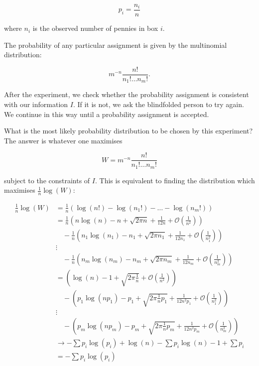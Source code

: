 \documentclass[
]{book}
\begin{document}
\[
p_i = \frac{n_i}{n} 
\]

where \(n_i\) is the observed number of pennies in box \(i\).

The probability of any particular assignment is given by the multinomial distribution:

\[
m^{-n} \frac{n!}{n_1! \dots n_m!}.
\]

After the experiment, we check whether the probability assignment is consistent with our information \(I\). If it is not, we ask the blindfolded person to try again. We continue in this way until a probability assignment is accepted.

What is the most likely probability distribution to be chosen by this experiment? The answer is whatever one maximises

\[
W = m^{-n} \frac{n!}{n_1! \dots n_m!}
\]

subject to the constraints of \(I\). This is equivalent to finding the distribution which maximises \(\frac{1}{n} \log(W)\):

\[
\begin{aligned}
\frac{1}{n} \log(W) &= \frac{1}{n} \left( \log(n!) - \log(n_1!) - \dots - \log(n_m!) \right) \\
 &= \frac{1}{n} \left( n \log(n) - n + \sqrt{2 \pi n} + \frac{1}{12n} + \mathcal{O}\left(\frac{1}{n^2}\right) \right) \\ 
 &\quad - \frac{1}{n} \left( n_1 \log(n_1) - n_1 + \sqrt{2 \pi n_1} + \frac{1}{12n_1} + \mathcal{O}\left(\frac{1}{n_1^2}\right)  \right) \\
 &\vdots \\
 &\quad- \frac{1}{n} \left( n_m \log(n_m) - n_m + \sqrt{2 \pi n_m} + \frac{1}{12n_m} + \mathcal{O}\left(\frac{1}{n_m^2}\right)  \right)  \\
 &= \left( \log(n) - 1 + \sqrt{2 \pi \frac{1}{n}} + \mathcal{O}\left(\frac{1}{n^2}\right) \right) \\ 
 &\quad- \left( p_1 \log(np_1) - p_1 + \sqrt{2 \pi \frac{1}{n}p_1} + \frac{1}{12n^2p_1} + \mathcal{O}\left(\frac{1}{n_1^2}\right)  \right) \\
 &\vdots \\
 &\quad- \left( p_m \log(np_m) - p_m + \sqrt{2 \pi \frac{1}{n}p_m} + \frac{1}{12n^2p_m} + \mathcal{O}\left(\frac{1}{n_m^2}\right)  \right) \\
 &\to -\sum p_i \log(p_i) +\log(n) -\sum p_i \log(n) - 1 + \sum p_i \\
 &= -\sum p_i \log(p_i)
\end{aligned}
\]
\end{document}
